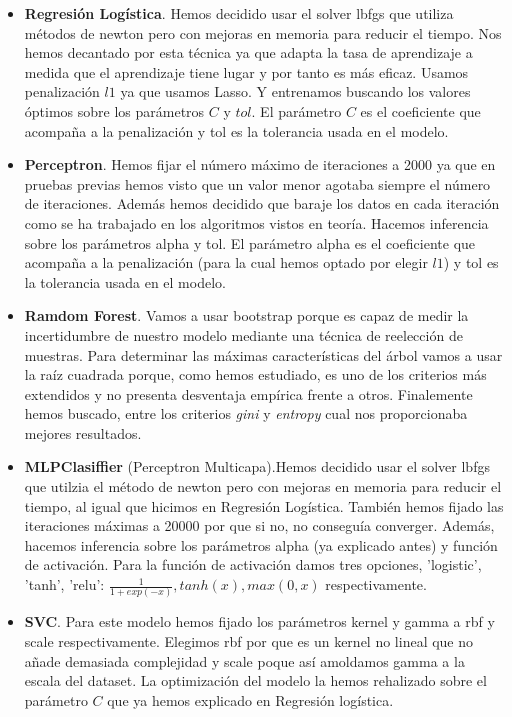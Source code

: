 \documentclass[11pt]{article}
\begin{document}
\begin{itemize}

\item \textbf{Regresión Logística}. Hemos decidido usar el solver lbfgs que
utiliza métodos de newton pero con mejoras en memoria para reducir el tiempo.
Nos hemos decantado por esta técnica ya que adapta la tasa de aprendizaje a
medida que el aprendizaje tiene lugar y por tanto es más eficaz. Usamos
penalización $l1$ ya que usamos Lasso. Y entrenamos buscando los valores óptimos
sobre los parámetros $C$ y $tol$. El parámetro $C$ es el coeficiente que
acompaña a la penalización y tol es la tolerancia usada en el modelo.

\item \textbf{Perceptron}. Hemos fijar el número máximo de iteraciones a 2000 ya
que en pruebas previas hemos visto que un valor menor agotaba siempre el número
de iteraciones. Además hemos decidido que baraje los datos en cada iteración
como se ha trabajado en los algoritmos vistos en teoría. Hacemos inferencia
sobre los parámetros alpha y tol. El parámetro alpha es el coeficiente que
acompaña a la penalización (para la cual hemos optado por elegir $l1$) y tol es
la tolerancia usada en el modelo.

\item \textbf{Ramdom Forest}. Vamos a usar bootstrap porque es capaz de medir la
incertidumbre de nuestro modelo mediante una técnica de reelección de muestras.
Para determinar las máximas características del árbol vamos a usar la raíz
cuadrada porque, como hemos estudiado, es uno de los criterios más extendidos y
no presenta desventaja empírica frente a otros. Finalemente hemos buscado,
entre los criterios \textit{gini} y \textit{entropy} cual nos proporcionaba 
mejores resultados.

\item \textbf{MLPClasiffier} (Perceptron Multicapa).Hemos decidido usar el
solver lbfgs que utilzia el método de newton pero con mejoras en memoria para
reducir el tiempo, al igual que hicimos en Regresión Logística. También hemos
fijado las iteraciones máximas a 20000 por que si no, no conseguía converger.
Además, hacemos inferencia sobre los parámetros alpha (ya explicado antes) y
función de activación. Para la función de activación damos tres opciones,
'logistic', 'tanh', 'relu': $ \frac{1}{1 + exp(-x)} , tanh(x), max(0, x)$
respectivamente.

\item \textbf{SVC}. Para este modelo hemos fijado los parámetros kernel y gamma
a rbf y scale respectivamente. Elegimos rbf por que es un kernel no lineal que
no añade demasiada complejidad y scale poque así amoldamos gamma a la escala del
dataset. La optimización del modelo la hemos rehalizado sobre el parámetro $C$
que ya hemos explicado en Regresión logística.

\end{itemize}
\end{document}
